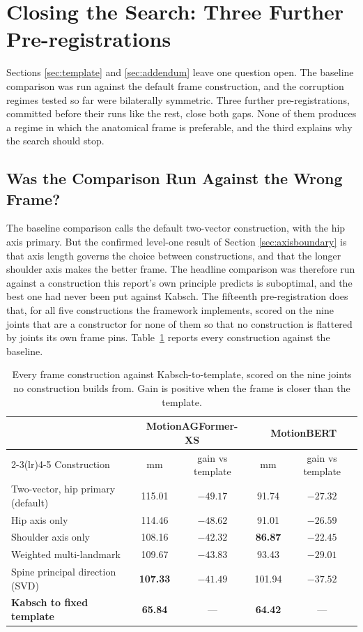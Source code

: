 \documentclass[12pt,a4paper]{report}
\begin{document}
\section{Closing the Search: Three Further Pre-registrations}
\label{sec:closing}

Sections \ref{sec:template} and \ref{sec:addendum} leave one question open. The
baseline comparison was run against the default frame construction, and the
corruption regimes tested so far were bilaterally symmetric. Three further
pre-registrations, committed before their runs like the rest, close both gaps.
None of them produces a regime in which the anatomical frame is preferable, and
the third explains why the search should stop.

\subsection{Was the Comparison Run Against the Wrong Frame?}

The baseline comparison calls the default two-vector construction, with the hip
axis primary. But the confirmed level-one result of Section \ref{sec:axisboundary}
is that axis length governs the choice between constructions, and that the longer
shoulder axis makes the better frame. The headline comparison was therefore run
against a construction this report's own principle predicts is suboptimal, and
the best one had never been put against Kabsch. The fifteenth pre-registration
does that, for all five constructions the framework implements, scored on the
nine joints that are a constructor for none of them so that no construction is
flattered by joints its own frame pins. Table~\ref{tab:bestframe} reports every
construction against the baseline.

\begin{table}[H]
\centering
\small
\caption[Every frame construction against the baseline]{Every frame construction against Kabsch-to-template, scored on the nine joints no construction builds from. Gain is positive when the frame is closer than the template.}
\label{tab:bestframe}
\begin{tabular}{lcccc}
\toprule
& \multicolumn{2}{c}{MotionAGFormer-XS} & \multicolumn{2}{c}{MotionBERT} \\
\cmidrule(lr){2-3}\cmidrule(lr){4-5}
Construction & mm & gain vs template & mm & gain vs template \\
\midrule
Two-vector, hip primary (default) & 115.01 & $-49.17$ & 91.74 & $-27.32$ \\
Hip axis only & 114.46 & $-48.62$ & 91.01 & $-26.59$ \\
Shoulder axis only & 108.16 & $-42.32$ & \textbf{86.87} & $-22.45$ \\
Weighted multi-landmark & 109.67 & $-43.83$ & 93.43 & $-29.01$ \\
Spine principal direction (SVD) & \textbf{107.33} & $-41.49$ & 101.94 & $-37.52$ \\
\midrule
\textbf{Kabsch to fixed template} & \textbf{65.84} & --- & \textbf{64.42} & --- \\
\bottomrule
\end{tabular}
\end{table}
\end{document}
